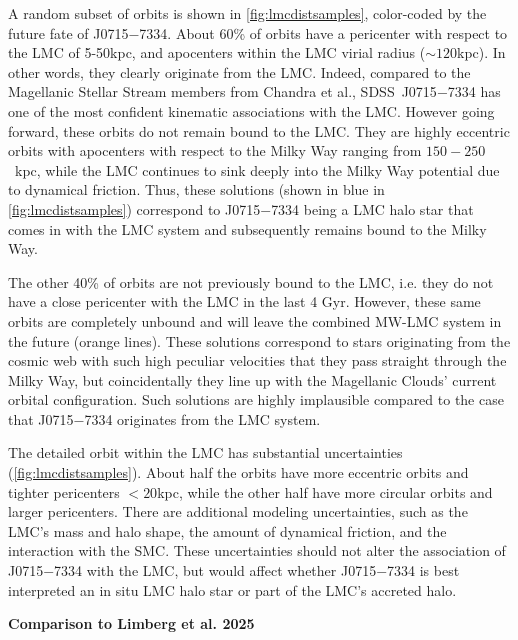 \documentclass{natureprintstyle}
\newcommand{\umpstarsdss}{SDSS~J0715$-$7334\xspace}
\newcommand{\umpstar}{J0715$-$7334\xspace}
\begin{document}
A random subset of orbits is shown in \ref{fig:lmcdistsamples}, color-coded by the future fate of \umpstar.
About 60\% of orbits have a pericenter with respect to the LMC of 5-50kpc, and apocenters within the LMC virial radius (${\sim}120$kpc). In other words, they clearly originate from the LMC. Indeed, compared to the Magellanic Stellar Stream members from Chandra et al.\cite{Chandra2023b}, \umpstarsdss{} has one of the most confident kinematic associations with the LMC.
However going forward, these orbits do not remain bound to the LMC. 
They are highly eccentric orbits with apocenters with respect to the Milky Way ranging from $150-250$~kpc, while the LMC continues to sink deeply into the Milky Way potential due to dynamical friction. Thus, these solutions (shown in blue in \ref{fig:lmcdistsamples}) correspond to \umpstar being a LMC halo star that comes in with the LMC system and subsequently remains bound to the Milky Way.

The other 40\% of orbits are not previously bound to the LMC, i.e. they do not have a close pericenter with the LMC in the last 4 Gyr. 
However, these same orbits are completely unbound and will leave the combined MW-LMC system in the future (orange lines). These solutions correspond to stars originating from the cosmic web with such high peculiar velocities that they pass straight through the Milky Way, but coincidentally they line up with the Magellanic Clouds' current orbital configuration. Such solutions are highly implausible compared to the case that \umpstar originates from the LMC system.

The detailed orbit within the LMC has substantial uncertainties (\ref{fig:lmcdistsamples}). About half the orbits have more eccentric orbits and tighter pericenters $<20$kpc, while the other half have more circular orbits and larger pericenters. There are additional modeling uncertainties, such as the LMC's mass and halo shape, the amount of dynamical friction, and the interaction with the SMC.
These uncertainties should not alter the association of \umpstar with the LMC, but would affect whether \umpstar is best interpreted an in situ LMC halo star or part of the LMC's accreted halo.

\vspace{1mm}
\noindent
{\bf Comparison to Limberg et al. 2025}
\end{document}
